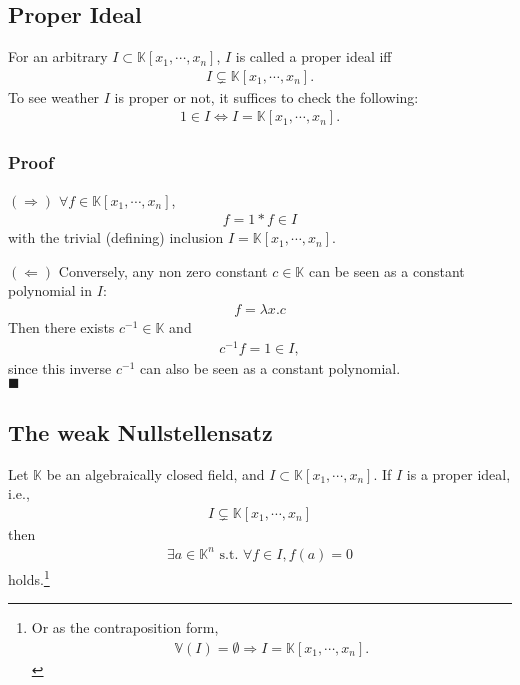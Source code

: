 \documentclass[11pt]{book}
\begin{document}
\subsection{Proper Ideal}
For an arbitrary $I \subset \mathbb{K}[x_1, \cdots, x_n]$, $I$ is called a proper ideal iff 
\begin{eqnarray}
I \subsetneq \mathbb{K}[x_1, \cdots, x_n].
\end{eqnarray}
To see weather $I$ is proper or not, it suffices to check the following:
\begin{eqnarray}
1 \in I \Leftrightarrow I = \mathbb{K}[x_1, \cdots, x_n].
\end{eqnarray}

\subsubsection{Proof}
$(\Rightarrow)$ $\forall f \in \mathbb{K}[x_1, \cdots, x_n]$,
\begin{eqnarray}
f = 1*f \in I
\end{eqnarray}
with the trivial (defining) inclusion $I = \mathbb{K}[x_1, \cdots, x_n]$.

$(\Leftarrow)$ Conversely, any non zero constant $c \in \mathbb{K}$ can be seen as a constant polynomial in $I$:
\begin{eqnarray}
f = \lambda x . c
\end{eqnarray}
Then there exists $c^{-1} \in \mathbb{K}$ and
\begin{eqnarray}
c^{-1} f = 1 \in I,
\end{eqnarray}
since this inverse $c^{-1}$ can also be seen as a constant polynomial.\\
$\blacksquare$

\subsection{The weak Nullstellensatz}
Let $\mathbb{K}$ be an algebraically closed field, and $I \subset \mathbb{K}[x_1, \cdots, x_n]$.
If $I$ is a proper ideal, i.e.,
\begin{eqnarray}
I \subsetneq \mathbb{K}[x_1, \cdots, x_n]
\end{eqnarray}
then
\begin{eqnarray}
\exists a \in \mathbb{K}^n \text{ s.t. } \forall f \in I, f(a) = 0
\end{eqnarray}
holds.\footnote{
Or as the contraposition form,
\begin{eqnarray}
\mathbb{V}(I) = \emptyset \Rightarrow I = \mathbb{K}[x_1, \cdots, x_n].
\end{eqnarray}
}
\end{document}
